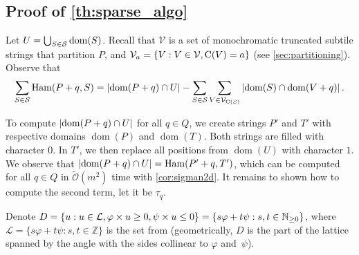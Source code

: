 \documentclass[11pt, letterpaper]{article}
\theoremstyle{plain}
\theoremstyle{definition}
\theoremstyle{remark}
\newcommand{\tO}{\tilde{\mathcal{O}}}
\renewcommand{\S}{\mathcal{S}}
\newcommand{\V}{\mathcal{V}}
\renewcommand{\L}{\mathcal{L}}
\renewcommand{\phi}{\varphi}
\newcommand{\set}[1]{\left\lbrace #1 \right\rbrace}
\DeclareMathOperator*{\Ham}{Ham}
\DeclareMathOperator*{\dom}{dom}
\newcommand{\absolute}[1]{\left\lvert#1\right\rvert}
\begin{document}
\subsection{Proof of \cref{th:sparse_algo}}
\SparseAlgo*
Let $U = \bigcup_{S \in \S} \d{S}$. Recall that $\V$ is a set of monochromatic truncated subtile strings that partition $P$, and $\V_a = \set{V : V \in \V, \getchar{V} = a}$ (see \ref{sec:partitioning}).
 Observe that
\begin{align}
\label{eq:sparse}
\sum_{S \in \S} \Ham(P + q, S) = \absolute{\d{P + q} \cap U} - \sum_{S \in \S}\sum_{V \in \V_{\getchar{S}}} \absolute{\d{S} \cap \d{V + q}}.
\end{align}

To compute $\absolute{\d{P + q} \cap U}$ for all $q \in Q$, we create strings $P'$ and $T'$ with respective domains $\dom(P)$ and $\dom(T)$. Both strings are filled with character $0$. 
In $T'$, we then replace all positions from $\dom(U)$ with character $1$. 
We observe that $\absolute{\d{P + q} \cap U} = \Ham(P' + q, T')$, which can be computed for all $q \in Q$ in $\tO(m^2)$ time with \cref{cor:sigman2d}.
It remains to shown how to compute the second term, let it be $\tau_q$. 

Denote $D = \set{u : u \in \L, \h{u} \ge 0, \s{u} \le 0} = \{ s\phi + t\psi : s,t \in \mathbb N_{\geq 0}\}$, where $\L = \{ s\phi + t\psi : s,t \in \mathbb Z\}$ is the set from  (geometrically, $D$ is the part of the lattice spanned by the angle with the sides collinear to $\phi$ and~$\psi$).
\end{document}

